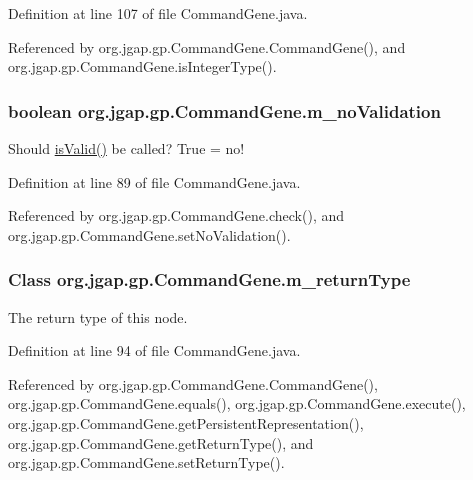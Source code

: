 Definition at line 107 of file Command\-Gene.\-java.



Referenced by org.\-jgap.\-gp.\-Command\-Gene.\-Command\-Gene(), and org.\-jgap.\-gp.\-Command\-Gene.\-is\-Integer\-Type().

\hypertarget{classorg_1_1jgap_1_1gp_1_1_command_gene_a843747066fa55788301f6205267f4e92}{
\subsubsection[{m\-\_\-no\-Validation}]{\setlength{\rightskip}{0pt plus 5cm}boolean org.\-jgap.\-gp.\-Command\-Gene.\-m\-\_\-no\-Validation\hspace{0.3cm}{\ttfamily [private]}}}\label{classorg_1_1jgap_1_1gp_1_1_command_gene_a843747066fa55788301f6205267f4e92}
Should \hyperlink{classorg_1_1jgap_1_1gp_1_1_command_gene_a48219d5f6d59be04610fe5bdac58e86a}{is\-Valid()} be called? True = no! 

Definition at line 89 of file Command\-Gene.\-java.



Referenced by org.\-jgap.\-gp.\-Command\-Gene.\-check(), and org.\-jgap.\-gp.\-Command\-Gene.\-set\-No\-Validation().

\hypertarget{classorg_1_1jgap_1_1gp_1_1_command_gene_a8f12f97706af7a21c916ca10c24b9ef6}{
\subsubsection[{m\-\_\-return\-Type}]{\setlength{\rightskip}{0pt plus 5cm}Class org.\-jgap.\-gp.\-Command\-Gene.\-m\-\_\-return\-Type\hspace{0.3cm}{\ttfamily [private]}}}\label{classorg_1_1jgap_1_1gp_1_1_command_gene_a8f12f97706af7a21c916ca10c24b9ef6}
The return type of this node. 

Definition at line 94 of file Command\-Gene.\-java.



Referenced by org.\-jgap.\-gp.\-Command\-Gene.\-Command\-Gene(), org.\-jgap.\-gp.\-Command\-Gene.\-equals(), org.\-jgap.\-gp.\-Command\-Gene.\-execute(), org.\-jgap.\-gp.\-Command\-Gene.\-get\-Persistent\-Representation(), org.\-jgap.\-gp.\-Command\-Gene.\-get\-Return\-Type(), and org.\-jgap.\-gp.\-Command\-Gene.\-set\-Return\-Type().

